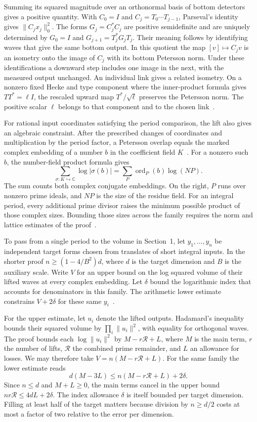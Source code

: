 \documentclass[11pt,letterpaper]{article}
\numberwithin{equation}{section}
\begin{document}
Summing its squared magnitude over an orthonormal basis of bottom detectors gives a positive quantity. With $C_0=I$ and $C_j=T_0\cdots T_{j-1}$, Parseval's identity gives $\|C_jx_j\|_0^2$. The forms $G_j=C_j^*C_j$ are positive semidefinite and are uniquely determined by $G_0=I$ and $G_{j+1}=T_j^*G_jT_j$. Their meaning follows by identifying waves that give the same bottom output. In this quotient the map $[v]\mapsto C_jv$ is an isometry onto the image of $C_j$ with its bottom Petersson norm. Under these identifications a downward step includes one image in the next, with the measured output unchanged. An individual link gives a related isometry. On a nonzero fixed Hecke and type component where the inner-product formula gives $TT^*=\ell I$, the rescaled upward map $T^*/\sqrt{\ell}$ preserves the Petersson norm. The positive scalar $\ell$ belongs to that component and to the chosen link~\cite{stagebasis}.

For rational input coordinates satisfying the period comparison, the lift also gives an algebraic constraint. After the prescribed changes of coordinates and multiplication by the period factor, a Petersson overlap equals the marked complex embedding of a number $b$ in the coefficient field $K$~\cite{shearrow}. For a nonzero such $b$, the number-field product formula gives
\[
 \sum_{\sigma:K\hookrightarrow\mathbb C}\log|\sigma(b)|
   =\sum_{P}\operatorname{ord}_{P}(b)\log (N P) .
\]
The sum counts both complex conjugate embeddings. On the right, $P$ runs over nonzero prime ideals, and $N P$ is the size of the residue field. For an integral period, every additional prime divisor raises the minimum possible product of those complex sizes. Bounding those sizes across the family requires the norm and lattice estimates of the proof~\cite{primeguide}.

To pass from a single period to the volume in Section~1, let $y_1,\ldots,y_n$ be independent target forms chosen from translates of short integral inputs. In the shorter proof $n\ge(1-4/B^2)d$, where $d$ is the target dimension and $B$ is the auxiliary scale. Write $V$ for an upper bound on the log squared volume of their lifted waves at every complex embedding. Let $\delta$ bound the logarithmic index that accounts for denominators in this family. The arithmetic lower estimate constrains $V+2\delta$ for these same $y_i$~\cite{volumelean}.

For the upper estimate, let $u_i$ denote the lifted outputs. Hadamard's inequality bounds their squared volume by $\prod_i\|u_i\|^2$, with equality for orthogonal waves. The proof bounds each $\log\|u_i\|^2$ by $M-r\mathcal R+L$, where $M$ is the main term, $r$ the number of lifts, $\mathcal R$ the combined prime remainder, and $L$ an allowance for losses. We may therefore take $V=n(M-r\mathcal R+L)$. For the same family the lower estimate reads
\[
 d(M-3L)\le n(M-r\mathcal R+L)+2\delta .
\]
Since $n\le d$ and $M+L\ge0$, the main terms cancel in the upper bound $nr\mathcal R\le4dL+2\delta$. The index allowance $\delta$ is itself bounded per target dimension. Filling at least half of the target matters because division by $n\ge d/2$ costs at most a factor of two relative to the error per dimension.
\end{document}
